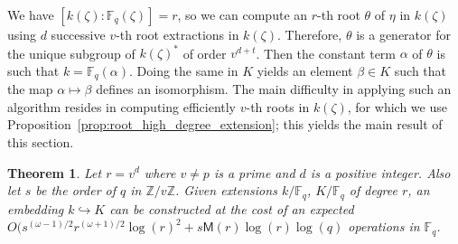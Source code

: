 \documentclass[12pt]{article}
\theoremstyle{plain}
\newtheorem{theorem}{Theorem}
\theoremstyle{definition}
\def\Z{\ensuremath{\mathbb{Z}}}
\def\F{\ensuremath{\mathbb{F}}}
\def\MM{\ensuremath{\mathsf{M}}}
\def\CC{\ensuremath{\mathsf{C}}}
\newcounter{algorithm}
\begin{document}
We have $[k(\zeta): \F_q(\zeta)] = r$, so we can 
compute an $r$-th root $\theta$ of $\eta$ in $k(\zeta)$ using $d$ successive $v$-th 
root extractions in $k(\zeta)$. Therefore, $\theta$ is a generator for the unique subgroup of 
$k(\zeta)^*$ of order $v^{d + t}$. Then the constant term $\alpha$ of $\theta$ is such that $k = 
\F_q(\alpha)$. %
Doing the same in $K$ yields an element $\beta\in K$ such that
the map $\alpha\mapsto\beta$ defines an isomorphism. %
The main difficulty in applying such an algorithm resides in computing
efficiently $v$-th roots in $k(\zeta)$, for which we use Proposition~\ref{prop:root_high_degree_extension};
this yields the main result of this section.
\begin{theorem}
	\label{theorem:isom-root}
	Let $r = v^d$ where $v \ne p$ is a prime and $d$ is a positive integer. Also let $s$ be the 
	order of $q$ in $\Z / v\Z$. Given extensions $k/\F_q$, $K/\F_q$ of degree $r$, an
        embedding $k\hookrightarrow K$ can be constructed at the cost of 
an expected $O(s^{(\omega-1)/2}r^{(\omega+1)/2}\log(r)^2 + s\MM(r)\log(r)\log(q)$
operations in $\F_q$.
\end{theorem}
\end{document}
